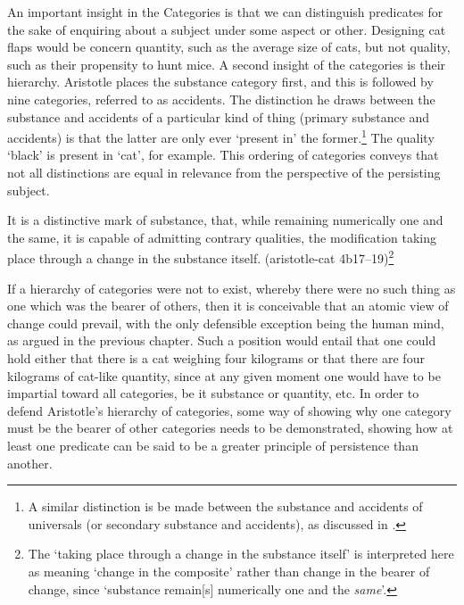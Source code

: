 An important insight in the Categories is that we can distinguish predicates for the sake of enquiring about a subject under some aspect or other.
Designing cat flaps would be concern quantity, such as the average size of cats, but not quality, such as their propensity to hunt mice. A second insight of the categories is their hierarchy. Aristotle places the substance category first, and this is followed by nine categories, referred to as accidents. The distinction he draws between the substance and accidents of a particular kind of thing (primary substance and accidents) is that the latter are only ever `present in' the former.\footnote{A similar distinction is be made between the substance and accidents of universals (or secondary substance and accidents), as discussed in \textcite[][]{sep-aristotle-categories}.} The quality `black' is present in `cat', for example.  This ordering of categories conveys that not all distinctions are equal in relevance from the perspective of the persisting subject.
\begin{quoting}
It is a distinctive mark of substance, that, while remaining numerically one and the same, it is capable of admitting contrary qualities, the modification taking place through a change in the substance itself. (\acrshort{aristotle-cat} 4b17--19)\footnote{The `taking place through a change in the substance itself' is interpreted here as meaning `change in the composite' rather than change in the bearer of change, since `substance remain[s] numerically one and the \emph{same}'.}
\end{quoting}

If a hierarchy of categories were not to exist, whereby there were no such thing as one which was the bearer of others, then it is conceivable that an atomic view of change could prevail, with the only defensible exception being the human mind, as argued in the previous chapter. Such a position would entail that one could hold either that there is a cat weighing four kilograms or that there are four kilograms of cat-like quantity, since at any given moment one would have to be impartial toward all categories, be it substance or quantity, etc.
In order to defend Aristotle's hierarchy of categories, some way of showing why one category must be the bearer of other categories needs to be demonstrated, showing how at least one predicate can be said to be a greater principle of persistence than another.

